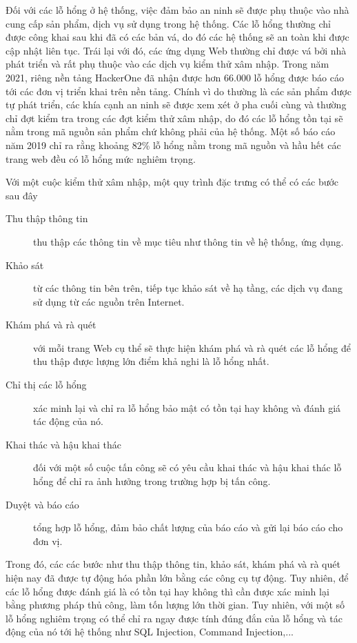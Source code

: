\documentclass[./../main.tex]{subfiles}
\begin{document}
Đối với các lỗ hổng ở hệ thống, việc đảm bảo an ninh sẽ được phụ thuộc vào nhà cung cấp sản phẩm, dịch vụ sử dụng trong hệ thống.
Các lỗ hổng thường chỉ được công khai sau khi đã có các bản vá, do đó các hệ thống sẽ an toàn khi được cập nhật liên tục.
Trái lại với đó, các ứng dụng Web thường chỉ được vá bởi nhà phát triển và rất phụ thuộc vào các dịch vụ kiểm thử xâm nhập.
Trong năm 2021, riêng nền tảng HackerOne đã nhận được hơn 66.000 lỗ hổng được báo cáo tới các đơn vị triển khai trên nền tảng.
Chính vì do thường là các sản phẩm được tự phát triển, các khía cạnh an ninh sẽ được xem xét ở pha cuối cùng và thường chỉ đợt
kiểm tra trong các đợt kiểm thử xâm nhập, do đó các lỗ hổng tồn tại sẽ nằm trong mã nguồn sản phẩm chứ không phải của hệ thống. Một số báo cáo năm 2019
chỉ ra rằng khoảng 82\% lỗ hổng nằm trong mã nguồn và hầu hết các trang web đều có lỗ hổng mức nghiêm trọng.

Với một cuộc kiểm thử xâm nhập, một quy trình đặc trưng có thể có các bước sau đây
\begin{description}
	\item [Thu thập thông tin] thu thập các thông tin về mục tiêu như thông tin về hệ thống, ứng dụng.
	\item [Khảo sát] từ các thông tin bên trên, tiếp tục khảo sát về hạ tầng, các dịch vụ đang sử dụng từ các nguồn trên Internet.
	\item [Khám phá và rà quét] với mỗi trang Web cụ thể sẽ thực hiện khám phá và rà quét các lỗ hổng để thu thập được lượng lớn điểm khả nghi là lỗ hổng nhất.
	\item [Chỉ thị các lỗ hổng] xác minh lại và chỉ ra lỗ hổng bảo mật có tồn tại hay không và đánh giá tác động của nó.
	\item [Khai thác và hậu khai thác] đối với một số cuộc tấn công sẽ có yêu cầu khai thác và hậu khai thác lỗ hổng để chỉ ra ảnh hưởng trong trường hợp bị tấn công.
	\item [Duyệt và báo cáo] tổng hợp lỗ hổng, đảm bảo chất lượng của báo cáo và gửi lại báo cáo cho đơn vị.
\end{description}
Trong đó, các các bước như thu thập thông tin, khảo sát, khám phá và rà quét hiện nay đã được tự động hóa phần lớn bằng các công cụ tự động. Tuy nhiên, để các lỗ hổng được đánh giá là có tồn tại hay không thì cần được xác minh lại bằng phương pháp thủ công, làm tốn lượng lớn thời gian. Tuy nhiên, với một số lỗ hổng nghiêm trọng có thể chỉ ra ngay được tính đúng đắn của lỗ hổng và tác động của nó tới hệ thống như SQL Injection, Command Injection,...
\end{document}
